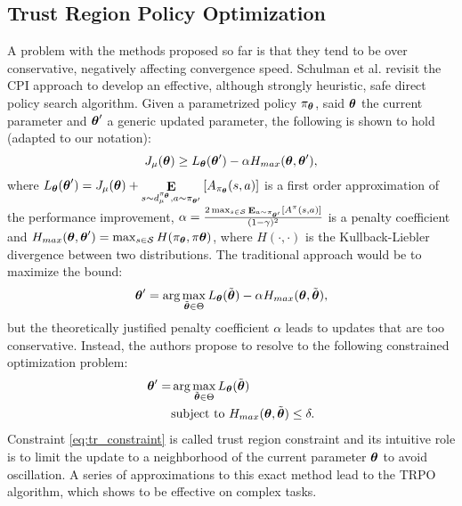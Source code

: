 \subsection{Trust Region Policy Optimization}
A problem with the methods proposed so far is that they tend to be over conservative, negatively affecting convergence speed. Schulman et al. \cite{schulman2015trust} revisit the \ac{CPI} approach to develop an effective, although strongly heuristic, safe direct policy search algorithm. Given a parametrized policy $\pi_{\boldsymbol{\theta}}$, said $\boldsymbol{\theta}$ the current parameter and $\boldsymbol{\theta}'$ a generic updated parameter, the following is shown to hold (adapted to our notation):
\[
	J_\mu(\boldsymbol{\theta}) \geq L_{\boldsymbol{\theta}}(\boldsymbol{\theta}') -\alpha H_{max}(\boldsymbol{\theta},\boldsymbol{\theta}'),
\]
where $L_{\boldsymbol{\theta}}(\boldsymbol{\theta}') = J_\mu(\boldsymbol{\theta}) + \mathop{\mathbf{E}}\limits_{s \sim d_{\mu}^{\pi_{\boldsymbol{\theta}}} , a \sim \pi_{\boldsymbol{\theta}'}}\left[A_{\pi_{\boldsymbol{\theta}}}(s,a)\right]$ is a first order approximation of the performance improvement, $\alpha=\frac{2\max_{s \in \mathcal{S}}{\mathop{\mathbf{E}}_{a\sim{\pi_{\boldsymbol{\theta}'}}}\left[A^{\pi}(s,a)\right]}}{(1-\gamma)^2}$ is a penalty coefficient and $H_{max}(\boldsymbol{\theta},\boldsymbol{\theta}')=\max_{s \in \mathcal{S}}{H(\pi_{\boldsymbol{\theta}},\pi{\boldsymbol{\theta}})}$, where $H(\cdot,\cdot)$ is the Kullback-Liebler divergence between two distributions.
The traditional approach would be to maximize the bound:
\[
	\boldsymbol{\theta}' = \arg\max\limits_{\tilde{\boldsymbol{\theta}} \in \Theta}{L_{\boldsymbol{\theta}}(\tilde{\boldsymbol{\theta}}) -\alpha H_{max}(\boldsymbol{\theta},\tilde{\boldsymbol{\theta}})},
\]
but the theoretically justified penalty coefficient $\alpha$ leads to updates that are too conservative. Instead, the authors propose to resolve to the following constrained optimization problem:
\begin{align}
\boldsymbol{\theta}' = &\arg\max\limits_{\tilde{\boldsymbol{\theta}} \in \Theta}{L_{\boldsymbol{\theta}}(\tilde{\boldsymbol{\theta}})} \\
	&\text{subject to } H_{max}(\boldsymbol{\theta},\tilde{\boldsymbol{\theta}}) \leq \delta. \label{eq:tr_constraint}
\end{align}
Constraint \ref{eq:tr_constraint} is called trust region constraint and its intuitive role is to limit the update to a neighborhood of the current parameter $\boldsymbol{\theta}$ to avoid oscillation. A series of approximations to this exact method lead to the \ac{TRPO} algorithm, which shows to be effective on complex tasks.

